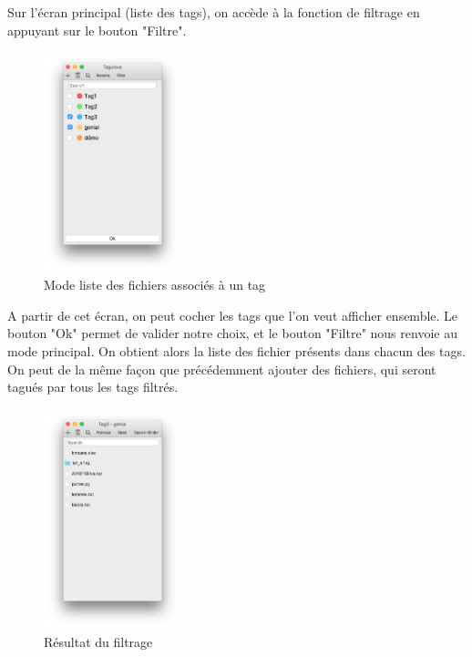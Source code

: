 \documentclass{report}
\begin{document}
    Sur l'écran principal (liste des tags), on accède à la fonction de filtrage en appuyant sur le bouton "Filtre".\\
    
    \begin{figure}[htbp]
            \begin{center}
            \includegraphics[width=4cm]{modefiltre.png}
            \caption{Mode liste des fichiers associés à un tag}
            \end{center}
        \end{figure}
    
    A partir de cet écran, on peut cocher les tags que l'on veut afficher ensemble. Le bouton "Ok" permet de valider notre choix, et le bouton "Filtre" nous renvoie au mode principal. On obtient alors la liste des fichier présents dans chacun des tags. On peut de la même façon que précédemment ajouter des fichiers, qui seront tagués par tous les tags filtrés.
    
    \begin{figure}[htbp]
            \begin{center}
            \includegraphics[width=4cm]{fichiersfiltre.png}
            \caption{Résultat du filtrage}
            \end{center}
        \end{figure}
    
\end{document}
